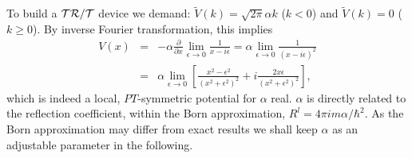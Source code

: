 To build a ${\cal{TR/T}}$ device we demand:
$\widetilde V(k) = \sqrt{2\pi} \alpha k$ ($k < 0$) and $\widetilde V(k) = 0$ ($k \ge 0$).
By inverse Fourier transformation, this implies
%
\begin{eqnarray}
V(x) &=&
-\alpha \frac{\partial}{\partial x} \lim_{\epsilon\to 0} \frac{1}{x - i \epsilon}
= \alpha \lim_{\epsilon\to 0} \frac{1}{(x - i \epsilon)^2}
\nonumber\\
&=& \alpha \lim_{\epsilon\to 0} \left[\frac{x^2 - \epsilon^2}{(x^2 + \epsilon^2)^2} + i
\frac{2 x\epsilon}{(x^2 + \epsilon^2)^2}\right],
\label{num}
\end{eqnarray}
%
which is indeed a local, $PT$-symmetric potential for $\alpha$ real.
$\alpha$ is directly related to the reflection coefficient, within the Born approximation,
$R^l = 4 \pi i m \alpha/\hbar^2$. As the Born approximation may differ from exact results
we shall keep $\alpha$ as an adjustable parameter
in the following.

